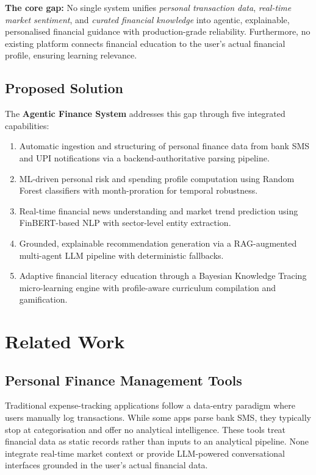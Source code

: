 \documentclass[conference]{IEEEtran}
\begin{document}
\textbf{The core gap:} No single system unifies \emph{personal transaction data}, \emph{real-time market sentiment}, and \emph{curated financial knowledge} into agentic, explainable, personalised financial guidance with production-grade reliability. Furthermore, no existing platform connects financial education to the user's actual financial profile, ensuring learning relevance.

\subsection{Proposed Solution}

The \textbf{Agentic Finance System} addresses this gap through five integrated capabilities:
\begin{enumerate}[leftmargin=*]
  \item Automatic ingestion and structuring of personal finance data from bank SMS and UPI notifications via a backend-authoritative parsing pipeline.
  \item ML-driven personal risk and spending profile computation using Random Forest classifiers with month-proration for temporal robustness.
  \item Real-time financial news understanding and market trend prediction using FinBERT-based NLP with sector-level entity extraction.
  \item Grounded, explainable recommendation generation via a RAG-augmented multi-agent LLM pipeline with deterministic fallbacks.
  \item Adaptive financial literacy education through a Bayesian Knowledge Tracing micro-learning engine with profile-aware curriculum compilation and gamification.
\end{enumerate}

\section{Related Work}

\subsection{Personal Finance Management Tools}

Traditional expense-tracking applications follow a data-entry paradigm where users manually log transactions. While some apps parse bank SMS, they typically stop at categorisation and offer no analytical intelligence. These tools treat financial data as static records rather than inputs to an analytical pipeline. None integrate real-time market context or provide LLM-powered conversational interfaces grounded in the user's actual financial data.
\end{document}
